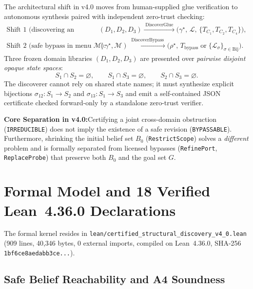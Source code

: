 \documentclass[10pt,a4paper]{article}
\newcommand{\code}[1]{\nolinkurl{#1}}
\newcommand{\takeaway}[2]{%
  \vspace{4pt}\noindent\colorbox{primary!7}{%
    \parbox{\dimexpr\linewidth-2\fboxsep\relax}{%
      \vspace{3pt}\textbf{\color{primary}#1:}\hspace{0.4em}#2\vspace{3pt}%
    }%
  }\vspace{4pt}%
}
\begin{document}
The architectural shift in v4.0 moves from human-supplied glue verification to autonomous synthesis paired with independent zero-trust checking:
\begin{align}\label{eq:pipeline}
\text{Shift 1 (discovering an obstruction):}\quad &
(D_1, D_2, D_3) \xrightarrow{\;\mathrm{DiscoverGlue}\;} \bigl(\gamma^\star,\, \mathcal{L},\, \{T_{C_1}, T_{C_2}, T_{C_4}\}\bigr), \\
\text{Shift 2 (safe bypass in menu $\mathcal{M}$):}\quad &
(\gamma^\star, \mathcal{M}) \xrightarrow{\;\mathrm{DiscoverBypass}\;} \bigl(\rho^\star,\, T_{\mathrm{bypass}} \;\text{or}\; \{\mathcal{L}_\sigma\}_{\sigma \in \mathrm{Bij}}\bigr).
\end{align}
Three frozen domain libraries $(D_1, D_2, D_3)$ are presented over \emph{pairwise disjoint opaque state spaces}:
\[
S_1 \cap S_2 = \varnothing, \qquad S_1 \cap S_3 = \varnothing, \qquad S_2 \cap S_3 = \varnothing.
\]
The discoverer cannot rely on shared state names; it must synthesize explicit bijections $\sigma_{12}: S_1 \to S_2$ and $\sigma_{13}: S_1 \to S_3$ and emit a self-contained JSON certificate checked forward-only by a standalone zero-trust verifier.

\takeaway{Core Separation in v4.0}{Certifying a joint cross-domain obstruction (\code{IRREDUCIBLE}) does not imply the existence of a safe revision (\code{BYPASSABLE}). Furthermore, shrinking the initial belief set $B_0$ (\code{RestrictScope}) solves a \emph{different} problem and is formally separated from licensed bypasses (\code{RefinePort}, \code{ReplaceProbe}) that preserve both $B_0$ and the goal set $G$.}

\section{Formal Model and 18 Verified Lean~4.36.0 Declarations}

The formal kernel resides in \code{lean/certified_structural_discovery_v4_0.lean} (909 lines, 40,346 bytes, 0 external imports, compiled on Lean~4.36.0, SHA-256 \code{1bf6ce8aedabb3ce...}).

\subsection{Safe Belief Reachability and A4 Soundness}
\end{document}
